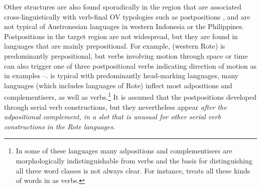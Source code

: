 Other structures are also found sporadically in the region that
are associated cross-linguistically with verb-final OV typologies
such as postpositions \citep{Dryer2013a,Dryer2013f},
and are not typical of Austronesian languages in western Indonesia or the Philippines.
Postpositions in the target region are not widespread,
but they are found in languages that are mainly prepositional.
For example,  (western Rote) is predominantly prepositional,
but verbs involving motion through space or time can also trigger
one of three postpositional verbs indicating direction of motion
\citep[291--293]{Tamelan2021} as in examples --.
 is typical with predominantly head-marking languages,
many  languages (which includes languages of
Rote) inflect most adpositions
and complementisers, as well as verbs.\footnote{
		In some of these
		languages many adpositions and complementisers are morphologically indistinguishable from
		verbs and the basis for distinguishing all three word classes is not always clear.
		For instance, \citet{Edwards2020} treats all these kinds
		of words in   as verbs.}
It is assumed that the
postpositions developed through serial verb constructions,
but they nevertheless appear \it{after} the adpositional complement,
in a slot that is unusual for other serial verb constructions
in the Rote languages.

\newpage
\begin{exe}
	\vspace{-1mm}
	\label{ex:}
	\label{ex:02-30}
	\label{ex:02-31}
\end{exe}

